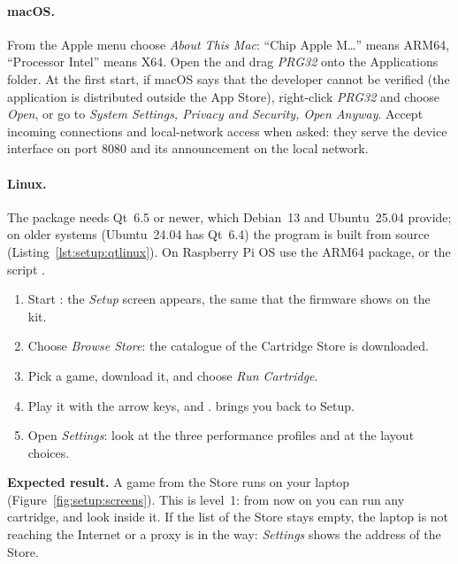 \paragraph{macOS.} From the Apple menu choose \emph{About This Mac}: ``Chip
Apple M\ldots'' means ARM64, ``Processor Intel'' means X64. Open the
 and drag \emph{PRG32} onto the Applications folder. At the first
start, if macOS says that the developer cannot be verified (the application is
distributed outside the App Store), right-click \emph{PRG32} and choose
\emph{Open}, or go to \emph{System Settings, Privacy and Security, Open
Anyway}. Accept incoming connections and local-network access when asked:
they serve the device interface on port 8080 and its announcement on the local
network.

\paragraph{Linux.} The package needs Qt~6.5 or newer, which Debian~13 and
Ubuntu~25.04 provide; on older systems (Ubuntu~24.04 has Qt~6.4) the program
is built from source (Listing~\ref{lst:setup:qtlinux}). On Raspberry Pi OS use
the ARM64 package, or the script .


\begin{prgtry}
\begin{enumerate}[nosep]
\item Start \prgqt: the \emph{Setup} screen appears, the same that the
  firmware shows on the kit.
\item Choose \emph{Browse Store}: the catalogue of the Cartridge Store is
  downloaded.
\item Pick a game, download it, and choose \emph{Run Cartridge}.
\item Play it with the arrow keys,  and .  brings
  you back to Setup.
\item Open \emph{Settings}: look at the three performance profiles and at the
  layout choices.
\end{enumerate}
\textbf{Expected result.} A game from the Store runs on your laptop
(Figure~\ref{fig:setup:screens}). This is level~1: from now on you can run any
cartridge, and look inside it. If the list of the Store stays empty, the
laptop is not reaching the Internet or a proxy is in the way: \emph{Settings}
shows the address of the Store.
\end{prgtry}


